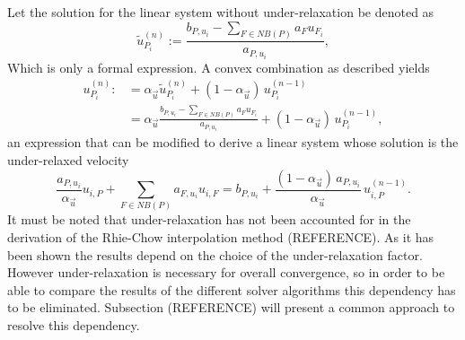     Let  the solution for the linear system without under-relaxation be denoted as
    \begin{displaymath}
      \tilde{u}_{P_i}^{(n)} := \frac{b_{P,u_i} - \sum_{F \in NB(P)} a_F u_{F_i}}{a_{P,u_i}},
    \end{displaymath}
    Which is only a formal expression. A convex combination as described yields
    \begin{align*}
      u_{P_i}^{(n)} :&= \alpha_{\vec{u}} \tilde{u}_{P_i}^{(n)} + (1 - \alpha_{\vec{u}} )\, u_{P_i}^{(n-1)} \\[0.5em]
                     &= \alpha_{\vec{u}} \frac{b_{P,u_i} - \sum_{F \in NB(P)} a_F u_{F_i}}{a_{P,u_i}} + (1 - \alpha_{\vec{u}} )\, u_{P_i}^{(n-1)},
    \end{align*}
    an expression that can be modified to derive a linear system whose solution is the under-relaxed velocity
    \begin{displaymath}
      \frac{a_{P,u_i}}{\alpha_{\vec{u}}} u_{i,P} + \sum_{F \in NB(P)} a_{F,u_i} u_{i,F} 
      = 
      b_{P,u_i} + \frac{(1 - \alpha_{\vec{u}})\, a_{P,u_i}}{\alpha_{\vec{u}}}\, u_{i,P}^{(n-1)}. 
    \end{displaymath}
    It must be noted that under-relaxation has not been accounted for in the derivation of the Rhie-Chow interpolation method (REFERENCE). As it has been shown the results depend on the choice of the under-relaxation factor. However under-relaxation is necessary for overall convergence, so in order to be able to compare the results of the different solver algorithms this dependency has to be eliminated. Subsection (REFERENCE) will present a common approach to resolve this dependency.

